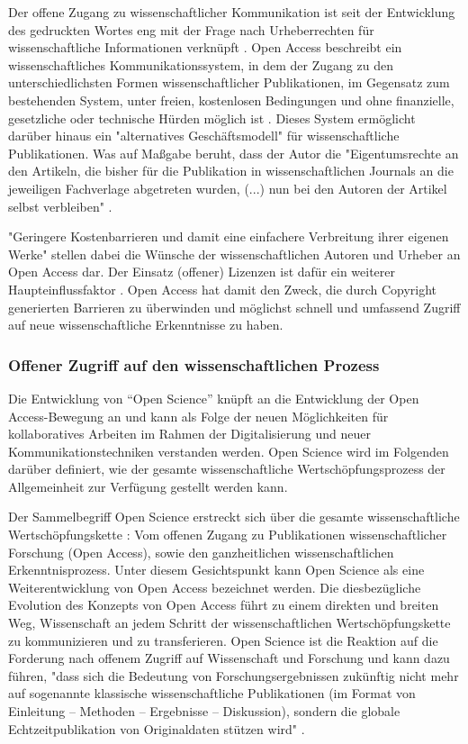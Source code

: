 Der offene Zugang zu wissenschaftlicher Kommunikation ist seit der Entwicklung des gedruckten Wortes eng mit der Frage nach Urheberrechten für wissenschaftliche Informationen verknüpft \cite{Case_2000}. Open Access beschreibt ein wissenschaftliches Kommunikationssystem, in dem der Zugang zu den unterschiedlichsten Formen wissenschaftlicher Publikationen, im Gegensatz zum bestehenden System, unter freien, kostenlosen Bedingungen und ohne finanzielle, gesetzliche oder technische Hürden möglich ist \cite{WD_bundestag_2009}. Dieses System ermöglicht darüber hinaus ein "alternatives Geschäftsmodell"\cite{lewis_2012_inevitability} für wissenschaftliche Publikationen. Was auf Maßgabe beruht, dass der Autor die "Eigentumsrechte an den Artikeln, die bisher für die Publikation in wissenschaftlichen Journals an die jeweiligen Fachverlage abgetreten wurden, (...) nun bei den Autoren der Artikel selbst verbleiben" \cite{Hess_2006}.

"Geringere Kostenbarrieren und damit eine einfachere Verbreitung ihrer eigenen Werke" \cite{WD_bundestag_2009} stellen dabei die Wünsche der wissenschaftlichen Autoren und Urheber an Open Access dar. Der Einsatz (offener) Lizenzen ist dafür ein weiterer Haupteinflussfaktor \cite{cite:16}. Open Access hat damit den Zweck, die durch Copyright generierten Barrieren zu überwinden und möglichst schnell und umfassend Zugriff auf neue wissenschaftliche Erkenntnisse zu haben.

\subsubsection{Offener Zugriff auf den wissenschaftlichen Prozess}

Die Entwicklung von “Open Science” knüpft an die Entwicklung der Open Access-Bewegung an und kann als Folge der neuen Möglichkeiten für kollaboratives Arbeiten im Rahmen der Digitalisierung und neuer Kommunikationstechniken verstanden werden. Open Science wird im Folgenden darüber definiert, wie der gesamte wissenschaftliche Wertschöpfungsprozess der Allgemeinheit zur Verfügung gestellt werden kann.

Der Sammelbegriff Open Science erstreckt sich über die gesamte wissenschaftliche Wertschöpfungskette \cite{Scheliga_2014}: Vom offenen Zugang zu Publikationen wissenschaftlicher Forschung (Open Access), sowie den ganzheitlichen wissenschaftlichen Erkenntnisprozess. Unter diesem Gesichtspunkt kann Open Science als eine Weiterentwicklung von Open Access bezeichnet werden. Die diesbezügliche Evolution des Konzepts von Open Access führt zu einem direkten und breiten Weg, Wissenschaft an jedem Schritt der wissenschaftlichen Wertschöpfungskette zu kommunizieren und zu transferieren. Open Science ist die Reaktion auf die Forderung nach offenem Zugriff auf Wissenschaft und Forschung und kann dazu führen, "dass sich die Bedeutung von Forschungsergebnissen zukünftig nicht mehr auf sogenannte klassische wissenschaftliche Publikationen (im Format von Einleitung – Methoden – Ergebnisse – Diskussion), sondern die globale Echtzeitpublikation von Originaldaten stützen wird" \cite{Stengel_2013}.

